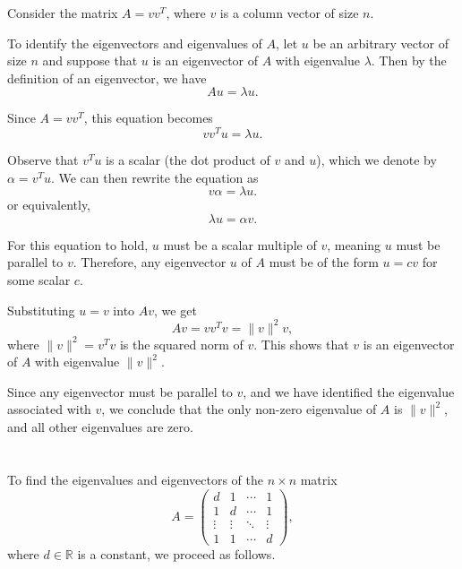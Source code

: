 \documentclass{article}
\begin{document}
Consider the matrix \( A = v v^T \), where \( v \) is a column vector of size \( n \).

To identify the eigenvectors and eigenvalues of \( A \), let \( u \) be an arbitrary vector of size \( n \) and suppose that \( u \) is an eigenvector of \( A \) with eigenvalue \( \lambda \). Then by the definition of an eigenvector, we have
\[
    A u = \lambda u.
\]

Since \( A = v v^T \), this equation becomes
\[
    v v^T u = \lambda u.
\]

Observe that \( v^T u \) is a scalar (the dot product of \( v \) and \( u \)), which we denote by \( \alpha = v^T u \). We can then rewrite the equation as
\[
    v \alpha = \lambda u.
\]
or equivalently,
\[
    \lambda u = \alpha v.
\]

For this equation to hold, \( u \) must be a scalar multiple of \( v \), meaning \( u \) must be parallel to \( v \). Therefore, any eigenvector \( u \) of \( A \) must be of the form \( u = c v \) for some scalar \( c \).

Substituting \( u = v \) into \( A v \), we get
\[
    A v = v v^T v = \| v \|^2 v,
\]
where \( \| v \|^2 = v^T v \) is the squared norm of \( v \). This shows that \( v \) is an eigenvector of \( A \) with eigenvalue \( \| v \|^2 \).

Since any eigenvector must be parallel to \( v \), and we have identified the eigenvalue associated with \( v \), we conclude that the only non-zero eigenvalue of \( A \) is \( \| v \|^2 \), and all other eigenvalues are zero.

\section{}

To find the eigenvalues and eigenvectors of the \( n \times n \) matrix
\[
    A = \left( \begin{array}{cccc}
            d      & 1      & \cdots & 1      \\
            1      & d      & \cdots & 1      \\
            \vdots & \vdots & \ddots & \vdots \\
            1      & 1      & \cdots & d
        \end{array} \right),
\]
where \( d \in \mathbb{R} \) is a constant, we proceed as follows.
\end{document}
